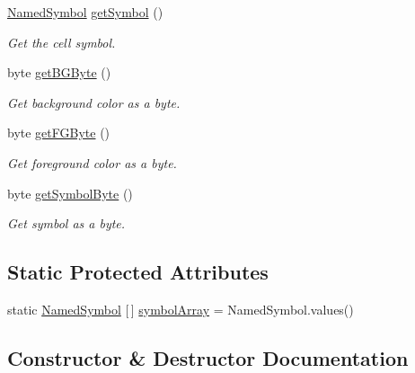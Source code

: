 \begin{DoxyCompactItemize}
\hyperlink{enumbridges_1_1base_1_1_named_symbol}{Named\+Symbol} \hyperlink{classbridges_1_1base_1_1_game_cell_a5c5ce5b363e442ac10c8588cbec77511}{get\+Symbol} ()
\begin{DoxyCompactList}\small\item\em Get the cell symbol. \end{DoxyCompactList}\item 
byte \hyperlink{classbridges_1_1base_1_1_game_cell_ad431b73e9e0c9e4b0ab539468e8d3a58}{get\+B\+G\+Byte} ()
\begin{DoxyCompactList}\small\item\em Get background color as a byte. \end{DoxyCompactList}\item 
byte \hyperlink{classbridges_1_1base_1_1_game_cell_ad1a05ce3e8ca8e148d867e6248023253}{get\+F\+G\+Byte} ()
\begin{DoxyCompactList}\small\item\em Get foreground color as a byte. \end{DoxyCompactList}\item 
byte \hyperlink{classbridges_1_1base_1_1_game_cell_a6b5589c577f2d89c0e98436eea667d77}{get\+Symbol\+Byte} ()
\begin{DoxyCompactList}\small\item\em Get symbol as a byte. \end{DoxyCompactList}\end{DoxyCompactItemize}
\subsection*{Static Protected Attributes}
\begin{DoxyCompactItemize}
\item 
static \hyperlink{enumbridges_1_1base_1_1_named_symbol}{Named\+Symbol} \mbox{[}$\,$\mbox{]} \hyperlink{classbridges_1_1base_1_1_game_cell_a558b0696aebc6676780316714bf60e0d}{symbol\+Array} = Named\+Symbol.\+values()
\end{DoxyCompactItemize}


\subsection{Constructor \& Destructor Documentation}
\mbox{\label{classbridges_1_1base_1_1_game_cell_a59a4bedeb15c55b71998635520eae21e}} 
